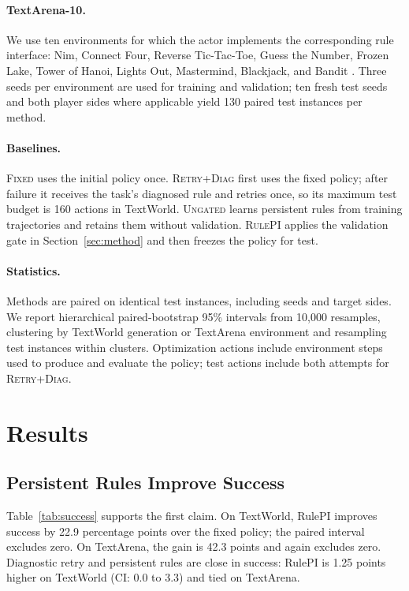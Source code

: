 \documentclass[11pt]{article}
\begin{document}
\paragraph{TextArena-10.}
We use ten environments for which the actor implements the corresponding rule interface: Nim, Connect Four, Reverse Tic-Tac-Toe, Guess the Number, Frozen Lake, Tower of Hanoi, Lights Out, Mastermind, Blackjack, and Bandit \citep{guertler2025textarena}.
Three seeds per environment are used for training and validation; ten fresh test seeds and both player sides where applicable yield 130 paired test instances per method.

\paragraph{Baselines.}
\textsc{Fixed} uses the initial policy once.
\textsc{Retry+Diag} first uses the fixed policy; after failure it receives the task's diagnosed rule and retries once, so its maximum test budget is 160 actions in TextWorld.
\textsc{Ungated} learns persistent rules from training trajectories and retains them without validation.
\textsc{RulePI} applies the validation gate in Section~\ref{sec:method} and then freezes the policy for test.

\paragraph{Statistics.}
Methods are paired on identical test instances, including seeds and target sides.
We report hierarchical paired-bootstrap 95\% intervals from 10,000 resamples, clustering by TextWorld generation or TextArena environment and resampling test instances within clusters.
Optimization actions include environment steps used to produce and evaluate the policy; test actions include both attempts for \textsc{Retry+Diag}.

\section{Results}

\subsection{Persistent Rules Improve Success}

Table~\ref{tab:success} supports the first claim.
On TextWorld, RulePI improves success by 22.9 percentage points over the fixed policy; the paired interval excludes zero.
On TextArena, the gain is 42.3 points and again excludes zero.
Diagnostic retry and persistent rules are close in success: RulePI is 1.25 points higher on TextWorld (CI: 0.0 to 3.3) and tied on TextArena.
\end{document}
